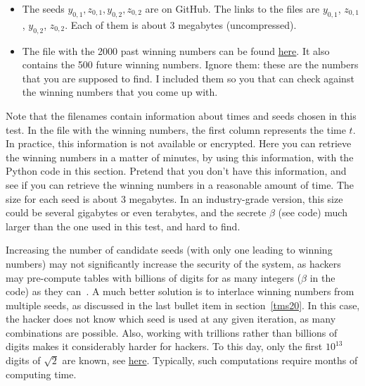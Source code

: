 \documentclass[oneside,10pt]{book}
\begin{document}
\begin{itemize}
\item The seeds $y_{0,1}, z_{0,1}, y_{0,2}, z_{0,2}$ are on GitHub. The links to the files are
 \href{https://github.com/VincentGranville/Stochastic-Processes/blob/master/lottery_seed_y10000000_2.txt}{$y_{0,1}$}, 
\href{https://github.com/VincentGranville/Stochastic-Processes/blob/master/lottery_seed_z10000000_2.txt}{$z_{0,1}$}, 
 \href{https://github.com/VincentGranville/Stochastic-Processes/blob/master/lottery_seed_y10000000_3.txt}{$y_{0,2}$}, 
 \href{https://github.com/VincentGranville/Stochastic-Processes/blob/master/lottery_seed_z10000000_3.txt}{$z_{0,2}$}.
Each of them is about 3 megabytes (uncompressed).
\item  The file with the 2000 past winning numbers can be found \href{https://github.com/VincentGranville/Stochastic-Processes/blob/master/lottery_winning_numbers_123903793_2.txt}{here}. 
It also contains the 500 future winning numbers. Ignore them: these are the numbers that you are supposed to find. I included them so you that can check against the winning numbers that you come up with. 
\end{itemize}\vspace{1ex}

\noindent Note that the filenames contain information about times and seeds chosen in this test. In the file with the winning numbers,
 the first column represents the time $t$. In practice, this information is not available or encrypted. Here you can retrieve
 the winning numbers in a matter of minutes, by using this information, with the Python code in this section. Pretend that you
 don't have this information, and see if you can retrieve the winning numbers in a reasonable amount of time. The
 size for each seed is about 3 megabytes. In an industry-grade version, this size could be several gigabytes or even terabytes, and the secrete $\beta$ (see code) much larger than the one used in this test, and hard to find. 


Increasing the number of candidate seeds (with only one leading to winning numbers) may not significantly increase the security of the system, as hackers may pre-compute tables with billions of digits for as many integers ($\beta$ in the code)  
as they can~\cite{rkan92}. A much better solution is to
 interlace winning numbers from multiple seeds, as discussed in the last bullet item in section~\ref{tms20}. In this case, the hacker
 does not know which seed is used at any given iteration, as many combinations are possible. Also, working with trillions rather than billions of digits makes it considerably harder for hackers. To this day, only the first $10^{13}$ digits of $\sqrt{2}$ are known, see \href{https://en.wikipedia.org/wiki/Square_root_of_2#Records_in_computation}{here}.
Typically, such computations require
 months of computing time. 
\end{document}
